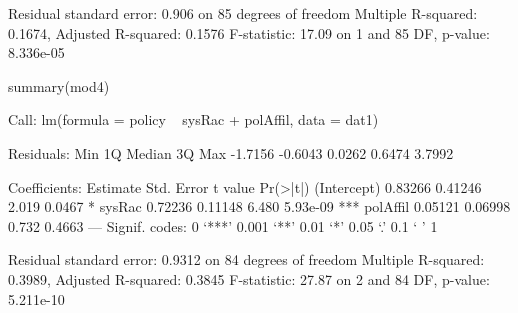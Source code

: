 \begin{Schunk}
\begin{Soutput}
Residual standard error: 0.906 on 85 degrees of freedom
Multiple R-squared:  0.1674,	Adjusted R-squared:  0.1576 
F-statistic: 17.09 on 1 and 85 DF,  p-value: 8.336e-05
\end{Soutput}
\begin{Sinput}
 summary(mod4)
\end{Sinput}
\begin{Soutput}
Call:
lm(formula = policy ~ sysRac + polAffil, data = dat1)

Residuals:
    Min      1Q  Median      3Q     Max 
-1.7156 -0.6043  0.0262  0.6474  3.7992 

Coefficients:
            Estimate Std. Error t value Pr(>|t|)    
(Intercept)  0.83266    0.41246   2.019   0.0467 *  
sysRac       0.72236    0.11148   6.480 5.93e-09 ***
polAffil     0.05121    0.06998   0.732   0.4663    
---
Signif. codes:  0 ‘***’ 0.001 ‘**’ 0.01 ‘*’ 0.05 ‘.’ 0.1 ‘ ’ 1

Residual standard error: 0.9312 on 84 degrees of freedom
Multiple R-squared:  0.3989,	Adjusted R-squared:  0.3845 
F-statistic: 27.87 on 2 and 84 DF,  p-value: 5.211e-10
\end{Soutput}
\end{Schunk}
